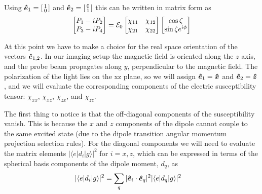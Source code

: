 Using  
$\bm{\hat{e}}_{1} = \left[ \begin{smallmatrix}  1 \\ 0 \end{smallmatrix} \right]$
and 
$\bm{\hat{e}}_{2} = \left[ \begin{smallmatrix}  0 \\ 1 \end{smallmatrix} \right]$
this can be written in matrix form as 
\begin{equation}
 \left[ \begin{matrix}  P_{1}-iP_{2} \\ P_{3}-iP_{4} \end{matrix} \right]
  =  \mathcal{E}_{0} 
 \left[ \begin{matrix}
     \chi_{11} & \chi_{12} \\ \chi_{21} & \chi_{22} 
 \end{matrix} \right]
 \left[ \begin{matrix}
      \cos\zeta \\
      \sin\zeta e^{i\phi}
 \end{matrix} \right]
\label{eq:polmatrix}
\end{equation}

At this point we have to make a choice for the real space orientation of the
vectors $\bm{\hat{e}}_{1,2}$.  In our imaging setup the magnetic field is
oriented along the $z$ axis, and the probe beam propagates along $y$,
perpendicular to the magnetic field.   The polarization of the light lies on
the xz plane, so we will assign $\bm{\hat{e}}_{1} = \bm{\hat{x}}$ and
$\bm{\hat{e}}_{2} = \bm{\hat{z}}$, and we will evaluate the corresponding
components of the electric susceptibility tensor: $\chi_{xx}$, $\chi_{xz}$,
$\chi_{zx}$, and $\chi_{zz}$.

The first thing to notice is that the off-diagonal components of the
susceptibility vanish.  This is because the $x$ and $z$ components of the
dipole cannot couple to the same excited state (due to the dipole transition
angular momentum projection selection rules).   For the diagonal components we
will need to evaluate the matrix elements $ | \langle e | d_{i} | g \rangle
|^{2} $ for $i=x,z$,  which can be expressed in terms of the spherical basis
components of the dipole moment, $d_{q}$, as 
\begin{align}
|\langle e | d_{i} | g \rangle|^{2} & =  \sum_{q} |\bm{\hat{e}}_{i}\cdot \bm{\hat{e}}_{q}|^{2} 
 | \langle e | d_{q} | g \rangle | ^{2} 
\end{align}

